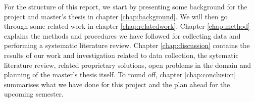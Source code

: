 For the structure of this report, we start by presenting some background for the project and master's thesis in chapter \ref{chap:background}. We will then go through some related work in chapter \ref{chap:relatedwork}. Chapter \ref{chap:method} explains the methods and procedures we have followed for collecting data and performing a systematic  literature review. Chapter \ref{chap:discussion} contains the results of our work and investigation related to data collection, the sytematic literature review, related proprietary solutions, open problems in the domain and planning of the master's thesis itself. To round off, chapter \ref{chap:conclusion} summarises what we have done for this project and the plan ahead for the upcoming semester.







\begin{comment}
The introduction of the thesis should take the reader all the way from the big picture and context of the project to the concrete task that has been solved in the thesis. A nice skeleton for a good introduction was given by \textcite{claerbout1991scrutiny}: \emph{review–claim–agenda}. In the review part, the background of the project is covered. This leads up to your claim, which is typically that some entity (software, device) or knowledge (research questions) is missing and sorely needed. The agenda part briefly summarises how your thesis contributes.
\end{comment}

